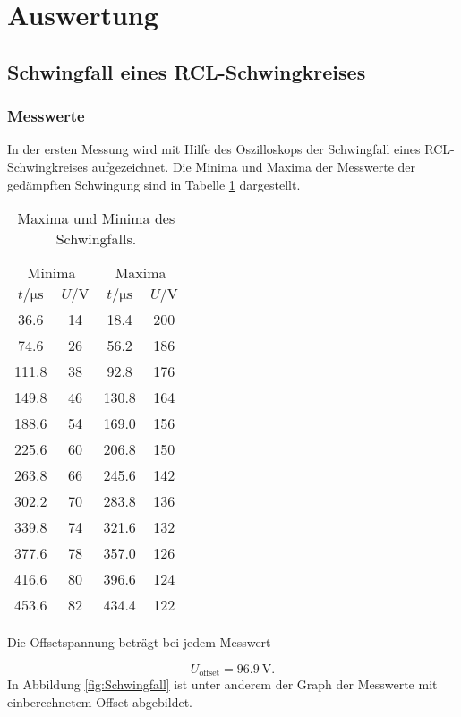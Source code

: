 \newpage
\section{Auswertung}
\label{sec:Auswertung}

\subsection{Schwingfall eines RCL-Schwingkreises}

\subsubsection{Messwerte}

In der ersten Messung wird mit Hilfe des Oszilloskops der Schwingfall eines
RCL-Schwingkreises aufgezeichnet. Die Minima und Maxima der Messwerte der
gedämpften Schwingung sind in Tabelle \ref{tab:Schwingfall} dargestellt.

\begin{table}[h]
  \centering
  \begin{tabular}{c c c c}
    \toprule
    \multicolumn{2}{c}{Minima} & \multicolumn{2}{c}{Maxima} \\
    $t/\si{\micro\second}$ & $U/\si{\V}$
    & $t/\si{\micro\second}$ & $U/\si{\V}$  \\
    \midrule
    36.6 & 14 & 18.4 & 200 \\
    74.6 & 26 & 56.2 & 186 \\
    111.8 & 38 & 92.8 & 176 \\
    149.8 & 46 & 130.8 & 164 \\
    188.6 & 54 & 169.0 & 156 \\
    225.6 & 60 & 206.8 & 150 \\
    263.8 & 66 & 245.6 & 142 \\
    302.2 & 70 & 283.8 & 136 \\
    339.8 & 74 & 321.6 & 132 \\
    377.6 & 78 & 357.0 & 126 \\
    416.6 & 80 & 396.6 & 124 \\
    453.6 & 82 & 434.4 & 122 \\
    \bottomrule
  \end{tabular}
  \caption{Maxima und Minima des Schwingfalls.}
  \label{tab:Schwingfall}
\end{table}

Die Offsetspannung beträgt bei jedem Messwert

\begin{equation}
  U_\text{offset} = \SI{96.9}{\V}.
\end{equation}
In Abbildung \ref{fig:Schwingfall} ist unter anderem der Graph der Messwerte
mit einberechnetem Offset abgebildet.

